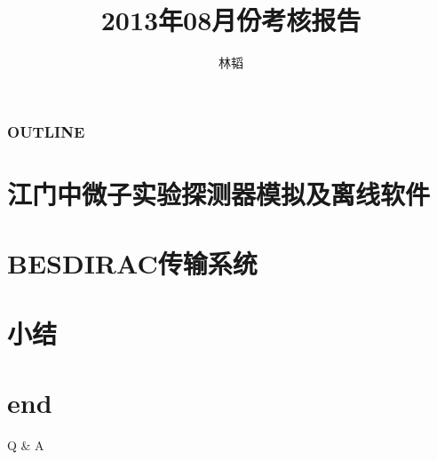 \documentclass{beamer}
\begin{document}
\title{2013年08月份考核报告}
\author{
    \texorpdfstring{林韬
                    \newline
                    \href{mailto:lintao@ihep.ac.cn}
                    {\footnotesize{}}}
                    {Lin Tao}
}

\maketitle

\begin{frame}
    \frametitle{OUTLINE}
    \tableofcontents
\end{frame}

\section{江门中微子实验探测器模拟及离线软件}
    
\section{BESDIRAC传输系统}
    
\section{小结}
    
\section*{end}
\begin{frame}
    \begin{center}
        \LARGE Q \& A
    \end{center}
\end{frame}
\end{document}
